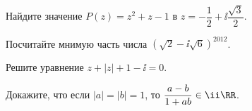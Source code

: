 %
%



\begin{problems}

\item
Найдите значение $P(z) = z^2 + z - 1$ в
$z = - \dfrac{1}{2} + \ii \dfrac{\sqrt{3}}{2}$.

\item
Посчитайте мнимую часть числа
$\left(\sqrt{2} - \ii \sqrt{6}\right)^{2012}$.

\item
Решите уравнение
$z + |z| + 1 - \ii = 0$.

\item
Докажите, что если
$|a| = |b| = 1$,
то
$\dfrac{a - b}{1 + a b} \in \ii \RR$.

\end{problems}

